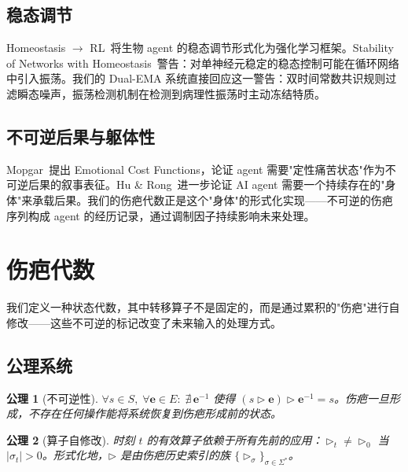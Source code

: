 \documentclass[11pt]{article}
\newtheorem{axiom}{公理}[section]
\begin{document}
\subsection{稳态调节}

Homeostasis $\to$ RL~\cite{homeostasis2025}将生物 agent 的稳态调节形式化为强化学习框架。Stability of Networks with Homeostasis~\cite{stability2015}警告：对单神经元稳定的稳态控制可能在循环网络中引入振荡。我们的 Dual-EMA 系统直接回应这一警告：双时间常数共识规则过滤瞬态噪声，振荡检测机制在检测到病理性振荡时主动冻结特质。

\subsection{不可逆后果与躯体性}

Mopgar~\cite{mopgar2026}提出 Emotional Cost Functions，论证 agent 需要"定性痛苦状态"作为不可逆后果的叙事表征。Hu \& Rong~\cite{hu2026}进一步论证 AI agent 需要一个持续存在的"身体"来承载后果。我们的伤疤代数正是这个"身体"的形式化实现——不可逆的伤疤序列构成 agent 的经历记录，通过调制因子持续影响未来处理。

\section{伤疤代数}
\label{sec:scar}

我们定义一种状态代数，其中转移算子不是固定的，而是通过累积的"伤疤"进行自修改——这些不可逆的标记改变了未来输入的处理方式。

\subsection{公理系统}

\begin{axiom}[不可逆性]
\label{ax:scar-irrev}
$\forall s \in S,\; \forall \mathbf{e} \in E:\; \nexists\, \mathbf{e}^{-1}$ 使得 $(s \triangleright \mathbf{e}) \triangleright \mathbf{e}^{-1} = s$。伤疤一旦形成，不存在任何操作能将系统恢复到伤疤形成前的状态。
\end{axiom}

\begin{axiom}[算子自修改]
\label{ax:scar-selfmod}
时刻 $t$ 的有效算子依赖于所有先前的应用：$\triangleright_t \neq \triangleright_0$ 当 $|\sigma_t| > 0$。形式化地，$\triangleright$ 是由伤疤历史索引的族 $\{\triangleright_\sigma\}_{\sigma \in \Sigma^*}$。
\end{axiom}
\end{document}
